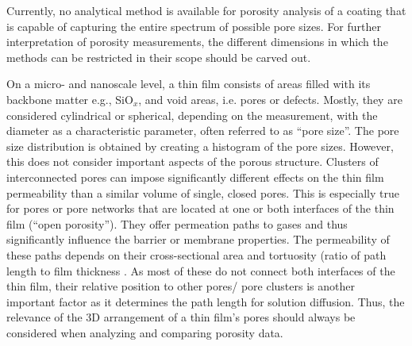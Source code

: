 \documentclass[AMA,STIX2COL]{WileyNJD-v2} %
\begin{document}

Currently, no analytical method is available for porosity analysis of a coating that is capable of capturing the entire spectrum of possible pore sizes. For further interpretation of porosity measurements, the different dimensions in which the methods can be restricted in their scope should be carved out.

On a micro- and nanoscale level, a thin film consists of areas filled with its backbone matter e.g., SiO$_x$, and void areas, i.e. pores or defects. Mostly, they are considered cylindrical or spherical, depending on the measurement, with the diameter as a characteristic parameter, often referred to as “pore size”. The pore size distribution is obtained by creating a histogram of the pore sizes. However, this does not consider important aspects of the porous structure. Clusters of interconnected pores can impose significantly different effects on the thin film permeability than a similar volume of single, closed pores. This is especially true for pores or pore networks that are located at one or both interfaces of the thin film (“open porosity”). They offer permeation paths to gases and thus significantly influence the barrier or membrane properties. The permeability of these paths depends on their cross-sectional area and tortuosity (ratio of path length to film thickness \cite{Menzel.2001}. As most of these do not connect both interfaces of the thin film, their relative position to other pores/ pore clusters is another important factor as it determines the path length for solution diffusion. Thus, the relevance of the 3D arrangement of a thin film’s pores should always be considered when analyzing and comparing porosity data.
\end{document}
